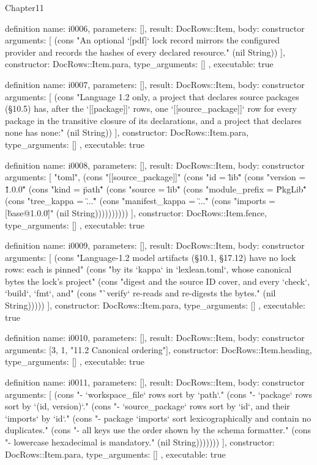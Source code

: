 \begin{lexlean}{Chapter11}
\begin{semanticmodule}
definition{
  name: i0006,
  parameters: [],
  result: DocRows::Item,
  body: constructor{
    arguments: [
      (cons "An optional `[pdf]` lock record mirrors the configured provider and records the hashes of every declared resource." (nil String))
    ],
    constructor: DocRows::Item.para,
    type_arguments: []
  },
  executable: true
}

definition{
  name: i0007,
  parameters: [],
  result: DocRows::Item,
  body: constructor{
    arguments: [
      (cons "Language 1.2 only, a project that declares source packages (§10.5) has, after the `[[package]]` rows, one `[[source_package]]` row for every package in the transitive closure of its declarations, and a project that declares none has none:" (nil String))
    ],
    constructor: DocRows::Item.para,
    type_arguments: []
  },
  executable: true
}

definition{
  name: i0008,
  parameters: [],
  result: DocRows::Item,
  body: constructor{
    arguments: [
      "toml",
      (cons "[[source_package]]" (cons "id = \"lib\"" (cons "version = \"1.0.0\"" (cons "kind = \"path\"" (cons "source = \"lib\"" (cons "module_prefix = \"PkgLib\"" (cons "tree_kappa = \"...\"" (cons "manifest_kappa = \"...\"" (cons "imports = [\"base@1.0.0\"]" (nil String))))))))))
    ],
    constructor: DocRows::Item.fence,
    type_arguments: []
  },
  executable: true
}

definition{
  name: i0009,
  parameters: [],
  result: DocRows::Item,
  body: constructor{
    arguments: [
      (cons "Language-1.2 model artifacts (§10.1, §17.12) have no lock rows: each is pinned" (cons "by its `kappa` in `lexlean.toml`, whose canonical bytes the lock's project" (cons "digest and the source ID cover, and every `check`, `build`, `fmt`, and" (cons "`verify` re-reads and re-digests the bytes." (nil String)))))
    ],
    constructor: DocRows::Item.para,
    type_arguments: []
  },
  executable: true
}

definition{
  name: i0010,
  parameters: [],
  result: DocRows::Item,
  body: constructor{
    arguments: [3, 1, "11.2 Canonical ordering"],
    constructor: DocRows::Item.heading,
    type_arguments: []
  },
  executable: true
}

definition{
  name: i0011,
  parameters: [],
  result: DocRows::Item,
  body: constructor{
    arguments: [
      (cons "- `workspace_file` rows sort by `path`." (cons "- `package` rows sort by `(id, version)`." (cons "- `source_package` rows sort by `id`, and their `imports` by `id`." (cons "- package `imports` sort lexicographically and contain no duplicates." (cons "- all keys use the order shown by the schema formatter." (cons "- lowercase hexadecimal is mandatory." (nil String)))))))
    ],
    constructor: DocRows::Item.para,
    type_arguments: []
  },
  executable: true
}


\end{semanticmodule}
\end{lexlean}
